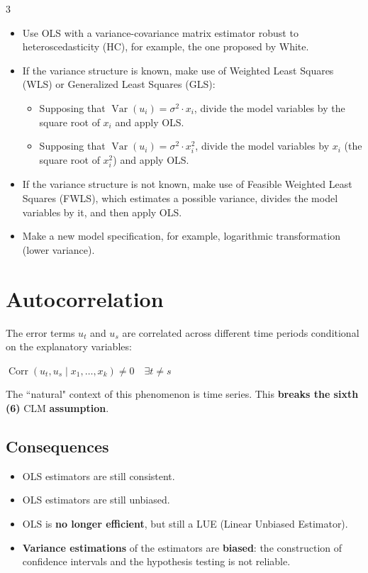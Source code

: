 \documentclass[10pt, a4paper, landscape]{article}
\DeclareMathOperator{\Var}{Var}
\DeclareMathOperator{\Corr}{Corr}
\begin{document}
\begin{multicols}{3}
\begin{itemize}[leftmargin=*]
	\item Use OLS with a variance-covariance matrix estimator robust to heteroscedasticity (HC), for example, the one proposed by White.
	\item If the variance structure is known, make use of Weighted Least Squares (WLS) or Generalized Least Squares (GLS):
	\begin{itemize}[leftmargin=*]
		\item Supposing that \( \Var(u_{i}) = \sigma^{2} \cdot x_{i} \), divide the model variables by the square root of \( x_{i} \) and apply OLS.
		\item Supposing that \( \Var(u_{i}) = \sigma^{2} \cdot x_{i}^{2} \), divide the model variables by \( x_{i} \) (the square root of \( x_{i}^{2} \)) and apply OLS.
	\end{itemize}
	\item If the variance structure is not known, make use of Feasible Weighted Least Squares (FWLS), which estimates a possible variance, divides the model variables by it, and then apply OLS.
	\item Make a new model specification, for example, logarithmic transformation (lower variance).
\end{itemize}

\columnbreak

\section*{Autocorrelation}

The error terms \( u_{t} \) and \( u_{s} \) are correlated across different time periods conditional on the explanatory variables:

\begin{center}
	\( \Corr(u_{t}, u_{s} \mid x_{1}, \ldots, x_{k}) \neq 0 \quad \exists t \neq s \)
\end{center}

The ``natural" context of this phenomenon is time series. This \textbf{breaks the sixth (6)} CLM \textbf{assumption}.

\subsection*{Consequences}

\begin{itemize}[leftmargin=*]
	\item OLS estimators are still consistent.
	\item OLS estimators are still unbiased.
	\item OLS is \textbf{no longer efficient}, but still a LUE (Linear Unbiased Estimator).
	\item \textbf{Variance estimations} of the estimators are \textbf{biased}: the construction of confidence intervals and the hypothesis testing is not reliable.
\end{itemize}


\end{multicols}
\end{document}

